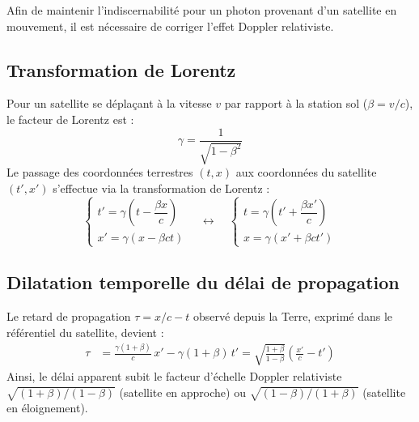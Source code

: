 \documentclass[11pt,a4paper]{article}
\begin{document}
Afin de maintenir l'indiscernabilité pour un photon provenant d'un satellite en mouvement,
il est nécessaire de corriger l'effet Doppler relativiste.

\subsection{Transformation de Lorentz}
Pour un satellite se déplaçant à la vitesse $v$ par rapport à la station sol
($\beta = v/c$), le facteur de Lorentz est :
\begin{equation}
    \gamma = \frac{1}{\sqrt{1 - \beta^2}}
\end{equation}
Le passage des coordonnées terrestres $(t, x)$ aux coordonnées du satellite $(t', x')$
s'effectue via la transformation de Lorentz :
\begin{equation}
    \begin{cases}
        t' = \gamma\!\left(t - \dfrac{\beta x}{c}\right) \\[6pt]
        x' = \gamma(x - \beta c t)
    \end{cases}
    \quad \longleftrightarrow \quad
    \begin{cases}
        t = \gamma\!\left(t' + \dfrac{\beta x'}{c}\right) \\[6pt]
        x = \gamma(x' + \beta c t')
    \end{cases}
\end{equation}

\subsection{Dilatation temporelle du délai de propagation}
Le retard de propagation $\tau = x/c - t$ observé depuis la Terre, exprimé dans
le référentiel du satellite, devient :
\begin{align}
    \tau &= \frac{\gamma(1+\beta)}{c}\,x' - \gamma(1+\beta)\,t'
         = \sqrt{\frac{1+\beta}{1-\beta}}\left(\frac{x'}{c} - t'\right)
\end{align}
Ainsi, le délai apparent subit le facteur d'échelle Doppler relativiste
$\sqrt{(1+\beta)/(1-\beta)}$ (satellite en approche) ou $\sqrt{(1-\beta)/(1+\beta)}$
(satellite en éloignement).
\end{document}
